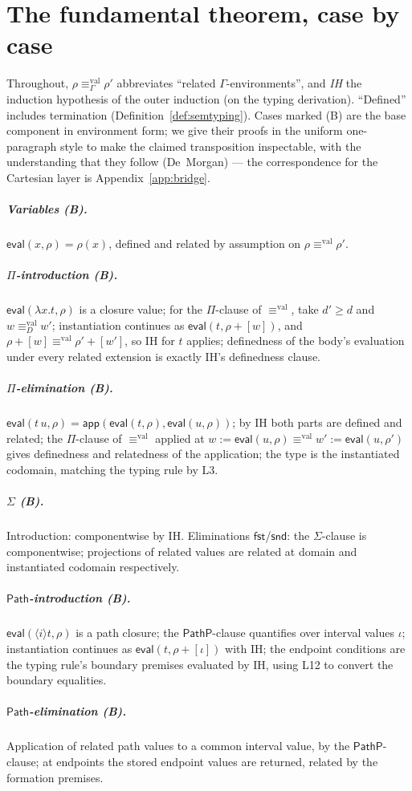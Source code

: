 \documentclass{lmcs}
\newcommand{\valeq}{\equiv^{\mathrm{val}}}
\newcommand{\Path}{\mathsf{Path}}
\providecommand{\fst}{}\renewcommand{\fst}{\mathsf{fst}}
\providecommand{\snd}{}\renewcommand{\snd}{\mathsf{snd}}
\newcommand{\evalop}{\mathsf{eval}}
\begin{document}
\section{The fundamental theorem, case by case}
\label{app:fund}

Throughout, $\rho \valeq_\Gamma \rho'$ abbreviates ``related
$\Gamma$-environments'', and \emph{IH} the induction hypothesis of
the outer induction (on the typing derivation).  ``Defined'' includes
termination (Definition~\ref{def:semtyping}).  Cases marked (B) are
the base component in environment form; we give their proofs in the
uniform one-paragraph style to make the claimed transposition
inspectable, with the understanding that they follow
\cite{HuberNorm} (De~Morgan) --- the correspondence for the Cartesian
layer is Appendix~\ref{app:bridge}.

\subparagraph*{Variables (B).}  $\evalop(x, \rho) = \rho(x)$, defined
and related by assumption on $\rho \valeq \rho'$.

\subparagraph*{$\Pi$-introduction (B).}  $\evalop(\lambda x.t, \rho)$
is a closure value; for the $\Pi$-clause of $\valeq$, take
$d' \ge d$ and $w \valeq_D w'$; instantiation continues as
$\evalop(t, \rho{+}[w])$, and $\rho{+}[w] \valeq \rho'{+}[w']$, so IH
for $t$ applies; definedness of the body's evaluation under every
related extension is exactly IH's definedness clause.

\subparagraph*{$\Pi$-elimination (B).}  $\evalop(t\,u, \rho) =
\mathsf{app}(\evalop(t,\rho), \evalop(u,\rho))$; by IH both parts are
defined and related; the $\Pi$-clause of $\valeq$ applied at
$w := \evalop(u,\rho) \valeq w' := \evalop(u,\rho')$ gives
definedness and relatedness of the application; the type is the
instantiated codomain, matching the typing rule by L3.

\subparagraph*{$\Sigma$ (B).}  Introduction: componentwise by IH.
Eliminations $\fst$/$\snd$: the $\Sigma$-clause is componentwise;
projections of related values are related at domain and instantiated
codomain respectively.

\subparagraph*{$\Path$-introduction (B).}
$\evalop(\langle i \rangle t, \rho)$ is a path closure; the
$\mathsf{PathP}$-clause quantifies over interval values $\iota$;
instantiation continues as $\evalop(t, \rho{+}[\iota])$ with IH; the
endpoint conditions are the typing rule's boundary premises evaluated
by IH, using L12 to convert the boundary equalities.

\subparagraph*{$\Path$-elimination (B).}  Application of related path
values to a common interval value, by the $\mathsf{PathP}$-clause;
at endpoints the stored endpoint values are returned, related by the
formation premises.
\end{document}
